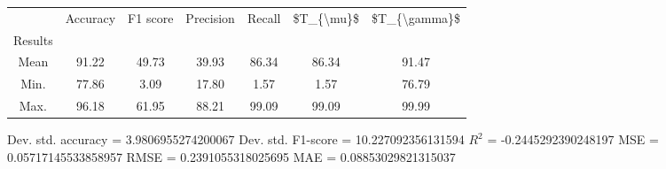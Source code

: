 \begin{tabular}{|c|c|c|c|c|c|c|}
\toprule
{} &  Accuracy &  F1 score &  Precision &  Recall &  \$T\_\{\textbackslash mu\}\$ &  \$T\_\{\textbackslash gamma\}\$ \\
Results &           &           &            &         &            &               \\
\hline
Mean    &     91.22 &     49.73 &      39.93 &   86.34 &      86.34 &         91.47 \\
Min.    &     77.86 &      3.09 &      17.80 &    1.57 &       1.57 &         76.79 \\
Max.    &     96.18 &     61.95 &      88.21 &   99.09 &      99.09 &         99.99 \\
\bottomrule
\end{tabular}

 Dev. std. accuracy = 3.9806955274200067
 Dev. std. F1-score = 10.227092356131594
 $R^2$ = -0.2445292390248197
 MSE = 0.05717145533858957
 RMSE = 0.2391055318025695
 MAE = 0.08853029821315037